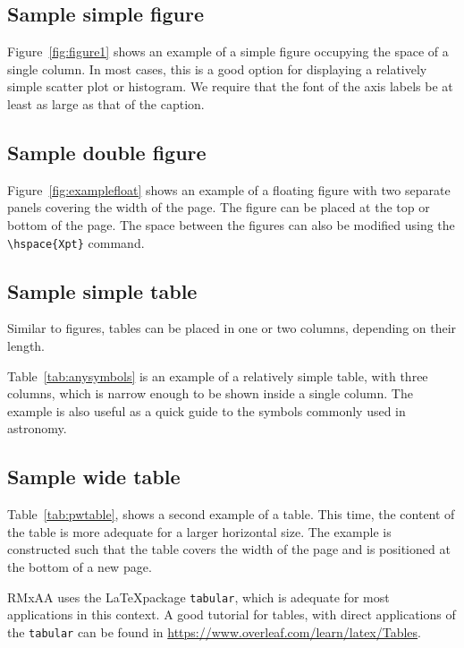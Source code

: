 \documentclass[9pt,twoside]{rmaa-rho-class/rmaa-rho_light}
\begin{document}
    \subsection{Sample simple figure}

        Figure~\ref{fig:figure1} shows an example of a simple figure occupying the space of a single column. In most cases, this is a good option for displaying a relatively simple scatter plot or histogram. We require that the font of the axis labels be at least as large as that of the caption.   
            
    \subsection{Sample double figure}

        Figure~\ref{fig:examplefloat} shows an example of a floating figure with two separate panels covering the width of the page. The figure can be placed at the top or bottom of the page. The space between the figures can also be modified using the \verb|\hspace{Xpt}| command.


    \subsection{Sample simple table}

        Similar to figures, tables can be placed in one or two columns, depending on their length.

        Table~\ref{tab:anysymbols} is an example of a relatively simple table, with three columns, which is narrow enough to be shown inside a single column. The example is also useful as a quick guide to the symbols commonly used in astronomy.

    \subsection{Sample wide table}

        Table~\ref{tab:pwtable}, shows a second example of a table. This time, the content of the table is more adequate for a larger horizontal size. The example is constructed such that the table covers the width of the page and is positioned at the bottom of a new page.


 RMxAA uses the \LaTeX package \texttt{tabular}, which is adequate for most applications in this context. A good tutorial for tables, with direct applications of the \texttt{tabular} can be found in \url{https://www.overleaf.com/learn/latex/Tables}. 
\end{document}
